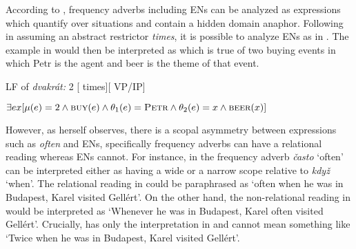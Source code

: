 \documentclass[output=paper,
modfonts,
hidelinks,
newtxmath
]{langscibook}
\begin{document}
\ea\label{frequency-degree-adverbs} 
\z \z

\ea\label{event-degree-numerals} 
\z \z

\noindent According to \cite{von_fintel_restrictions_1994}, frequency adverbs including ENs can be analyzed as expressions which quantify over situations and contain a hidden domain anaphor. Following \cite{doetjes_adverbs_2007} in assuming an abstract restrictor \textit{times}, it is possible to analyze ENs as in . The example in  would then be interpreted as  which is true of two buying events in which Petr is the agent and beer is the theme of that event.

\ea\label{dvakrat-LF} LF of \textit{dvakrát:} 2 [ times][ VP/IP]
\z

\ea\label{dvakrat-interpretation} $\exists ex[\mu(e)=2 \wedge \textsc{buy}(e) \wedge \theta_1(e)=\textsc{Petr} \wedge \theta_2(e)=x \wedge \textsc{beer}(x)]$
\z 

\noindent However, as \cite{doetjes_adverbs_2007} herself observes, there is a scopal asymmetry between expressions such as \textit{often} and ENs, specifically frequency adverbs can have a relational reading whereas ENs cannot. For instance, in  the frequency adverb \textit{často} `often' can be interpreted either as having a wide or a narrow scope relative to \textit{když} `when'. The relational reading in  could be paraphrased as `often when he was in Budapest, Karel visited Gellért'. On the other hand, the non-relational reading in  would be interpreted as `Whenever he was in Budapest, Karel often visited Gellért'. Crucially,  has only the interpretation in  and cannot mean something like `Twice when he was in Budapest, Karel visited Gellért'.
\end{document}

